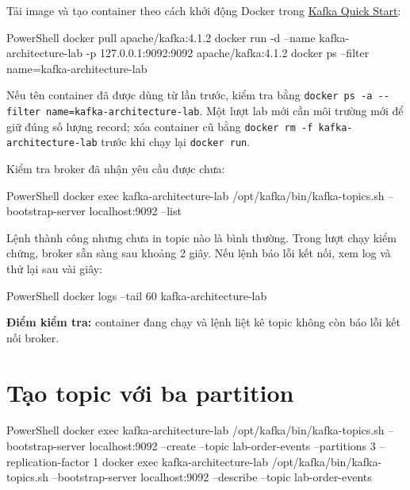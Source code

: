 Tải image và tạo container theo cách khởi động Docker trong \href{https://kafka.apache.org/41/getting-started/quickstart/}{Kafka Quick Start}:


\begin{aivncodebox}[language={}]{PowerShell}
docker pull apache/kafka:4.1.2
docker run -d --name kafka-architecture-lab -p 127.0.0.1:9092:9092 apache/kafka:4.1.2
docker ps --filter name=kafka-architecture-lab
\end{aivncodebox}

Nếu tên container đã được dùng từ lần trước, kiểm tra bằng \texttt{docker ps -\allowbreak{}a -\allowbreak{}-\allowbreak{}filter name=\allowbreak{}kafka-\allowbreak{}architecture-\allowbreak{}lab}. Một lượt lab mới cần môi trường mới để giữ đúng số lượng record; xóa container cũ bằng \texttt{docker rm -\allowbreak{}f kafka-\allowbreak{}architecture-\allowbreak{}lab} trước khi chạy lại \texttt{docker run}.


Kiểm tra broker đã nhận yêu cầu được chưa:


\begin{aivncodebox}[language={}]{PowerShell}
docker exec kafka-architecture-lab /opt/kafka/bin/kafka-topics.sh --bootstrap-server localhost:9092 --list
\end{aivncodebox}

Lệnh thành công nhưng chưa in topic nào là bình thường. Trong lượt chạy kiểm chứng, broker sẵn sàng sau khoảng 2 giây. Nếu lệnh báo lỗi kết nối, xem log và thử lại sau vài giây:


\begin{aivncodebox}[language={}]{PowerShell}
docker logs --tail 60 kafka-architecture-lab
\end{aivncodebox}

\begin{evidencebox}
\textbf{Điểm kiểm tra:} container đang chạy và lệnh liệt kê topic không còn báo lỗi kết nối broker.
\end{evidencebox}

\section{Tạo topic với ba partition}

\begin{aivncodebox}[language={}]{PowerShell}
docker exec kafka-architecture-lab /opt/kafka/bin/kafka-topics.sh --bootstrap-server localhost:9092 --create --topic lab-order-events --partitions 3 --replication-factor 1
docker exec kafka-architecture-lab /opt/kafka/bin/kafka-topics.sh --bootstrap-server localhost:9092 --describe --topic lab-order-events
\end{aivncodebox}

